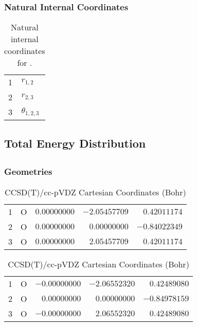 \documentclass[10pt,oneside]{article}
\begin{document}
\begin{table}[h!]
\subsubsection*{Natural Internal Coordinates}
\centering
\caption{Natural internal coordinates for .}
\small
\begin{tabular}{ll}
\toprule
  1   & $r_{1,2}$ \\
  2   & $r_{2,3}$ \\
  3   & $\theta_{1,2,3}$ \\
\bottomrule
\end{tabular}
\end{table}

\begin{table}
\subsection*{Total Energy Distribution}
\centering\end{table}

\clearpage

\subsection{}

\begin{table}[h!]
\subsubsection*{Geometries}
\begin{multicols}{2}
\centering
\caption{CCSD(T)/cc-pVTZ Cartesian Coordinates (Bohr)}
\begin{tabular}{llrrr}
\toprule
1  & O  & $ 0.00000000$ & $-2.05457709$ & $ 0.42011174$ \\
2  & O  & $ 0.00000000$ & $ 0.00000000$ & $-0.84022349$ \\
3  & O  & $ 0.00000000$ & $ 2.05457709$ & $ 0.42011174$ \\
\bottomrule
\end{tabular}
\caption{CCSD(T)/cc-pVDZ Cartesian Coordinates (Bohr)}
\begin{tabular}{llrrr}
\toprule
1  & O  & $-0.00000000$ & $-2.06552320$ & $ 0.42489080$ \\
2  & O  & $ 0.00000000$ & $ 0.00000000$ & $-0.84978159$ \\
3  & O  & $-0.00000000$ & $ 2.06552320$ & $ 0.42489080$ \\
\bottomrule
\end{tabular}
\end{multicols}
\end{table}
\end{document}

